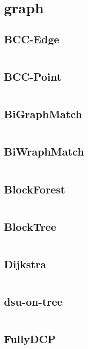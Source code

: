 \documentclass[a4]{article}
\begin{document}
\section{graph}
\subsection{BCC-Edge}
\inputminted[mathescape,linenos,numbersep=5pt,frame=lines,framesep=2mm]{cpp}{src/graph/BCC-Edge.cpp}
\subsection{BCC-Point}
\inputminted[mathescape,linenos,numbersep=5pt,frame=lines,framesep=2mm]{cpp}{src/graph/BCC-Point.cpp}
\subsection{BiGraphMatch}
\inputminted[mathescape,linenos,numbersep=5pt,frame=lines,framesep=2mm]{cpp}{src/graph/BiGraphMatch.cpp}
\subsection{BiWraphMatch}
\inputminted[mathescape,linenos,numbersep=5pt,frame=lines,framesep=2mm]{cpp}{src/graph/BiWraphMatch.cpp}
\subsection{BlockForest}
\inputminted[mathescape,linenos,numbersep=5pt,frame=lines,framesep=2mm]{cpp}{src/graph/BlockForest.cpp}
\subsection{BlockTree}
\inputminted[mathescape,linenos,numbersep=5pt,frame=lines,framesep=2mm]{cpp}{src/graph/BlockTree.cpp}
\subsection{Dijkstra}
\inputminted[mathescape,linenos,numbersep=5pt,frame=lines,framesep=2mm]{cpp}{src/graph/Dijkstra.cpp}
\subsection{dsu-on-tree}
\inputminted[mathescape,linenos,numbersep=5pt,frame=lines,framesep=2mm]{cpp}{src/graph/dsu-on-tree.cpp}
\subsection{FullyDCP}
\inputminted[mathescape,linenos,numbersep=5pt,frame=lines,framesep=2mm]{cpp}{src/graph/FullyDCP.cpp}
\end{document}

